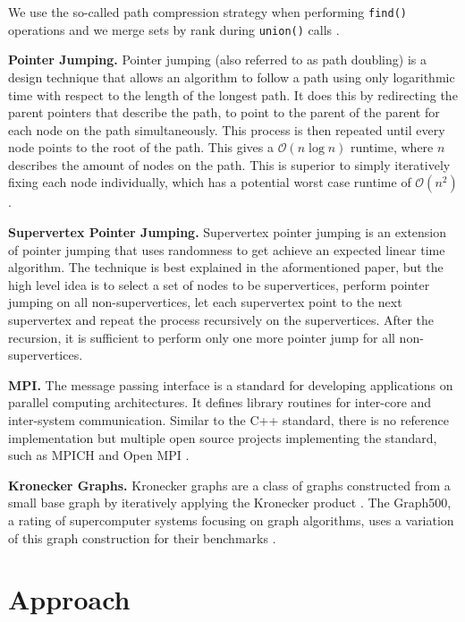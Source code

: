 \documentclass[letterpaper]{article}
\newcommand{\bigoh}{\mathcal O}
\newcommand{\mypar}[1]{{\bf #1.}}
\begin{document}
We use the so-called path compression strategy when performing \verb|find()| operations and we merge sets by rank during
\verb|union()| calls \cite{intro_to_algos}.

\mypar{Pointer Jumping}
Pointer jumping \cite{jeje1992introduction} (also referred to as path doubling) is a design technique that allows an
algorithm to follow a path using only logarithmic time with respect to the length of the longest path. It does this by
redirecting the parent pointers that describe the path, to point to the parent of the parent for each node on the path
simultaneously. This process is then repeated until every node points to the root of the path. This gives a $\bigoh(n
\log n)$ runtime, where $n$ describes the amount of nodes on the path. This is superior to simply iteratively fixing
each node individually, which has a potential worst case runtime of $\bigoh(n^2)$.

\mypar{Supervertex Pointer Jumping}
Supervertex pointer jumping \cite{chung1996parallel} is an extension of pointer jumping that uses randomness to get
achieve an expected linear time algorithm. The technique is best explained in the aformentioned paper, but the high
level idea is to select a set of nodes to be supervertices, perform pointer jumping on all non-supervertices, let each
supervertex point to the next supervertex and repeat the process recursively on the supervertices. After the recursion,
it is sufficient to perform only one more pointer jump for all non-supervertices.

\mypar{MPI}
The message passing interface \cite{clarke1994mpi} is a standard for developing applications on parallel computing
architectures. It defines library routines for inter-core and inter-system communication. Similar to the
C++ standard, there is no reference implementation but multiple open source projects implementing the standard, such as
MPICH and Open MPI \cite{gabriel2004open}.

\mypar{Kronecker Graphs}
Kronecker graphs are a class of graphs constructed from a small base graph by iteratively applying the Kronecker product
\cite{leskovec2010kronecker}. The Graph500, a rating of supercomputer systems focusing on graph algorithms, uses a
variation of this graph construction for their benchmarks \cite{graph500}.

\section{Approach}
\label{sec:approach}
\end{document}
